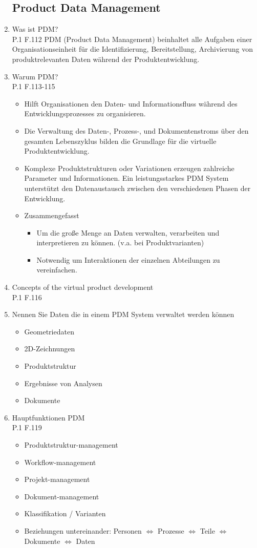 \documentclass[10pt,a4paper,fleqn]{article}
\begin{document}
\begin{enumerate}
\subsection{Product Data Management}
	\item Was ist PDM?\\
		P.1 F.112
		PDM (Product Data Management) beinhaltet alle Aufgaben einer Organisationseinheit für die Identifizierung, Bereitstellung, Archivierung von produktrelevanten Daten während der Produktentwicklung.
	\item Warum PDM?\\
		P.1 F.113-115
		\begin{itemize}
			\item Hilft Organisationen den Daten- und Informationsfluss während des Entwicklungsprozesses zu organisieren.
			\item Die Verwaltung des Daten-, Prozess-, und Dokumentenstroms über den gesamten Lebenszyklus bilden die Grundlage für die virtuelle Produktentwicklung.
			\item Komplexe Produktstrukturen oder Variationen erzeugen zahlreiche Parameter und Informationen. Ein leistungsstarkes PDM System unterstützt den Datenaustausch zwischen den verschiedenen Phasen der Entwicklung.
			\item Zusammengefasst
				\begin{itemize}
					\item Um die große Menge an Daten verwalten, verarbeiten und interpretieren zu können. (v.a. bei Produktvarianten)
					\item Notwendig um Interaktionen der einzelnen Abteilungen zu vereinfachen.
				\end{itemize}
		\end{itemize}
	\item Concepts of the virtual product development\\
		P.1 F.116
\pagebreak
	\item Nennen Sie Daten die in einem PDM System verwaltet werden können
		\begin{itemize}
			\item Geometriedaten
			\item 2D-Zeichnungen
			\item Produktstruktur
			\item Ergebnisse von Analysen
			\item Dokumente
		\end{itemize}
	\item Hauptfunktionen PDM\\
		P.1 F.119
		\begin{itemize}
			\item Produktstruktur-management
			\item Workflow-management
			\item Projekt-management
			\item Dokument-management
			\item Klassifikation / Varianten
			\item Beziehungen untereinander: Personen $\Leftrightarrow$ Prozesse $\Leftrightarrow$ Teile $\Leftrightarrow$ Dokumente $\Leftrightarrow$ Daten
		\end{itemize}
\newpage

\end{enumerate}
\end{document}

